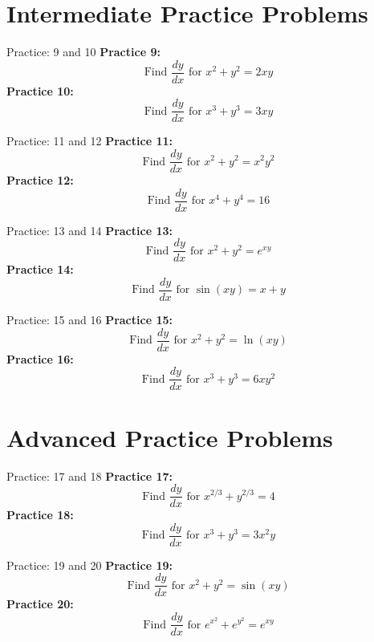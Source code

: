 \documentclass[aspectratio=169]{beamer}
\begin{document}
\section{Intermediate Practice Problems}

\begin{frame}{Practice: 9 and 10}
\textbf{Practice 9:}
\[
\text{Find } \frac{dy}{dx} \text{ for } x^2 + y^2 = 2xy
\]
\vspace{1em}
\textbf{Practice 10:}
\[
\text{Find } \frac{dy}{dx} \text{ for } x^3 + y^3 = 3xy
\]
\end{frame}

\begin{frame}{Practice: 11 and 12}
\textbf{Practice 11:}
\[
\text{Find } \frac{dy}{dx} \text{ for } x^2 + y^2 = x^2y^2
\]
\vspace{1em}
\textbf{Practice 12:}
\[
\text{Find } \frac{dy}{dx} \text{ for } x^4 + y^4 = 16
\]
\end{frame}

\begin{frame}{Practice: 13 and 14}
\textbf{Practice 13:}
\[
\text{Find } \frac{dy}{dx} \text{ for } x^2 + y^2 = e^{xy}
\]
\vspace{1em}
\textbf{Practice 14:}
\[
\text{Find } \frac{dy}{dx} \text{ for } \sin(xy) = x + y
\]
\end{frame}

\begin{frame}{Practice: 15 and 16}
\textbf{Practice 15:}
\[
\text{Find } \frac{dy}{dx} \text{ for } x^2 + y^2 = \ln(xy)
\]
\vspace{1em}
\textbf{Practice 16:}
\[
\text{Find } \frac{dy}{dx} \text{ for } x^3 + y^3 = 6xy^2
\]
\end{frame}

\section{Advanced Practice Problems}

\begin{frame}{Practice: 17 and 18}
\textbf{Practice 17:}
\[
\text{Find } \frac{dy}{dx} \text{ for } x^{2/3} + y^{2/3} = 4
\]
\vspace{1em}
\textbf{Practice 18:}
\[
\text{Find } \frac{dy}{dx} \text{ for } x^3 + y^3 = 3x^2y
\]
\end{frame}

\begin{frame}{Practice: 19 and 20}
\textbf{Practice 19:}
\[
\text{Find } \frac{dy}{dx} \text{ for } x^2 + y^2 = \sin(xy)
\]
\vspace{1em}
\textbf{Practice 20:}
\[
\text{Find } \frac{dy}{dx} \text{ for } e^{x^2} + e^{y^2} = e^{xy}
\]
\end{frame}
\end{document}
